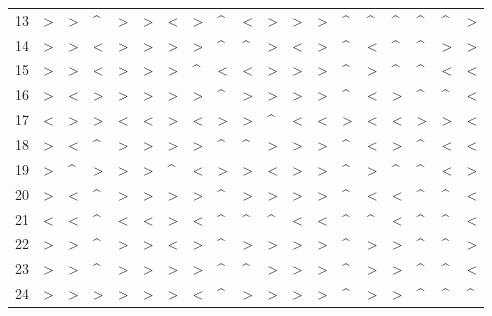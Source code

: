 \begin{tabular}{lllllllllllllllllll}
13  &  > &  > &  \textasciicircum  &  > &  > &  < &  > &  \textasciicircum  &  < &  > &  > &  > &  \textasciicircum  &  \textasciicircum  &  \textasciicircum  &  \textasciicircum  &  \textasciicircum  &  > \\
14  &  > &  > &  < &  > &  > &  > &  > &  \textasciicircum  &  \textasciicircum  &  > &  < &  > &  \textasciicircum  &  < &  \textasciicircum  &  \textasciicircum  &  > &  > \\
15  &  > &  > &  < &  > &  > &  > &  \textasciicircum  &  < &  < &  > &  > &  > &  \textasciicircum  &  > &  \textasciicircum  &  \textasciicircum  &  < &  < \\
16  &  > &  < &  > &  > &  > &  > &  > &  \textasciicircum  &  > &  > &  > &  > &  \textasciicircum  &  < &  > &  \textasciicircum  &  \textasciicircum  &  < \\
17  &  < &  > &  > &  < &  < &  > &  < &  > &  > &  \textasciicircum  &  < &  < &  > &  < &  < &  > &  > &  < \\
18  &  > &  < &  \textasciicircum  &  > &  > &  > &  > &  \textasciicircum  &  \textasciicircum  &  > &  > &  > &  \textasciicircum  &  < &  > &  \textasciicircum  &  < &  < \\
19  &  > &  \textasciicircum  &  > &  > &  > &  \textasciicircum  &  < &  > &  > &  < &  > &  > &  \textasciicircum  &  > &  \textasciicircum  &  \textasciicircum  &  < &  > \\
20  &  > &  < &  \textasciicircum  &  > &  > &  > &  > &  \textasciicircum  &  > &  > &  > &  > &  \textasciicircum  &  < &  < &  \textasciicircum  &  \textasciicircum  &  < \\
21  &  < &  < &  \textasciicircum  &  < &  < &  > &  < &  \textasciicircum  &  \textasciicircum  &  \textasciicircum  &  < &  < &  \textasciicircum  &  \textasciicircum  &  < &  \textasciicircum  &  \textasciicircum  &  < \\
22  &  > &  > &  \textasciicircum  &  > &  > &  < &  > &  \textasciicircum  &  > &  > &  > &  > &  \textasciicircum  &  > &  > &  \textasciicircum  &  \textasciicircum  &  > \\
23  &  > &  > &  \textasciicircum  &  > &  > &  > &  > &  \textasciicircum  &  \textasciicircum  &  > &  > &  > &  \textasciicircum  &  > &  > &  \textasciicircum  &  \textasciicircum  &  < \\
24  &  > &  > &  > &  > &  > &  > &  < &  \textasciicircum  &  > &  > &  > &  > &  \textasciicircum  &  > &  > &  \textasciicircum  &  \textasciicircum  &  \textasciicircum  \\

\end{tabular}
